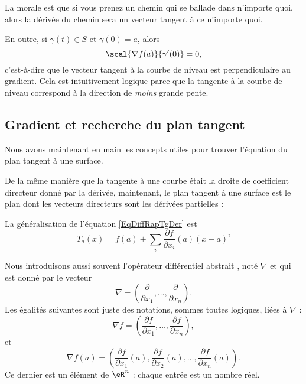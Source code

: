 La morale est que si vous prenez un chemin qui se ballade dans n'importe quoi, alors la dérivée du chemin sera un vecteur tangent à ce n'importe quoi.

En outre, si \( \gamma(t)\in S\) et \( \gamma(0)=a\), alors
\begin{equation}
	\scal{\nabla f(a)}{\gamma'(0)}=0,
\end{equation}
c'est-à-dire que le vecteur tangent à la courbe de niveau est perpendiculaire au gradient. Cela est intuitivement logique parce que la tangente à la courbe de niveau correspond à la direction de \emph{moins} grande pente.

\subsection{Gradient et recherche du plan tangent}

Nous avons maintenant en main les concepts utiles pour trouver l'équation du plan tangent à une surface.

De la même manière que la tangente à une courbe était la droite de coefficient directeur donné par la dérivée, maintenant, le plan tangent à une surface est le plan dont les vecteurs directeurs sont les dérivées partielles :

La généralisation de l'équation \eqref{EqDiffRapTgDer} est
\begin{equation}        \label{EqDefPlanTag}
	T_a(x)=f(a)+\sum_i\frac{ \partial f }{ \partial x_i }(a)(x-a)^i
\end{equation}

Nous introduisons aussi souvent l'opérateur différentiel abstrait , noté \( \nabla\) et qui est donné par le vecteur
\begin{equation}
	\nabla=\left( \frac{ \partial  }{ \partial x_1 },\ldots,\frac{ \partial  }{ \partial x_n } \right).
\end{equation}
Les égalités suivantes sont juste des notations, sommes toutes logiques, liées à \( \nabla\) :
\begin{equation}
	\nabla f=\left( \frac{ \partial f }{ \partial x_1 },\ldots,\frac{ \partial f }{ \partial x_n } \right),
\end{equation}
et
\begin{equation}        \label{EqDefGradient}
	\nabla f(a) = \left(\frac{\partial f}{\partial x_1}(a), \frac{\partial f}{\partial x_2}(a), \ldots, \frac{\partial f}{\partial x_n}(a)\right).
\end{equation}
Ce dernier est un élément de \( \eR^n\) : chaque entrée est un nombre réel.

